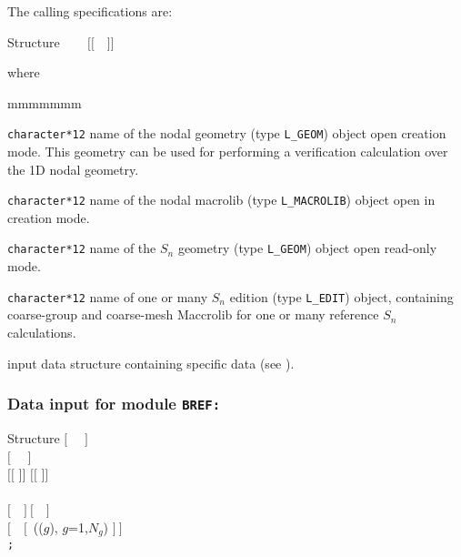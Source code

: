 The calling specifications are:

\begin{DataStructure}{Structure }
 ~\moc{:=}~~ $[[$~~$]]$ \moc{::}  \\
\end{DataStructure}

\noindent where
\begin{ListeDeDescription}{mmmmmmm}

\item[\dusa{GEOM}] {\tt character*12} name of the nodal {\sc geometry} (type {\tt L\_GEOM}) object open creation mode. This geometry can be used for
performing a verification calculation over the 1D nodal geometry.

\item[\dusa{MACRO}] {\tt character*12} name of the nodal {\sc macrolib} (type {\tt L\_MACROLIB}) object open in creation mode.

\item[\dusa{GEOM\_SN}] {\tt character*12} name of the $S_n$ {\sc geometry} (type {\tt L\_GEOM}) object open read-only mode.

\item[\dusa{EDIT\_SN}] {\tt character*12} name of one or many $S_n$ {\sc edition} (type {\tt L\_EDIT}) object, containing coarse-group and
coarse-mesh Maccrolib for one or many reference $S_n$ calculations.

\item[\dusa{BREF\_data}] input data structure containing specific data (see ).

\end{ListeDeDescription}

\subsubsection{Data input for module {\tt BREF:}}\label{sect:descBREF}

\begin{DataStructure}{Structure }
$[$~ ~$]$ \\
$[$~ ~$]$ \\
 $[[$  $]]$  $[[$  $]]$ \\
  \\
$[$~~$]~[$~~$]$ \\
$[$~~$[$~(($g$), $g$=1,$N_g$) $]~]$ \\
{\tt ;}
\end{DataStructure}

